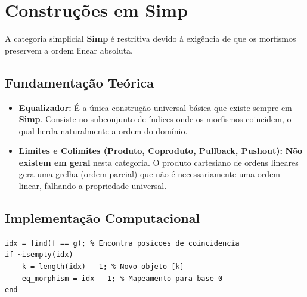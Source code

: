 \section{Construções em Simp}

A categoria simplicial \textbf{Simp} é restritiva devido à exigência de que os morfismos preservem a ordem linear absoluta.

\subsection{Fundamentação Teórica}
\begin{itemize}
    \item \textbf{Equalizador:} É a única construção universal básica que existe sempre em \textbf{Simp}. Consiste no subconjunto de índices onde os morfismos coincidem, o qual herda naturalmente a ordem do domínio.
    \item \textbf{Limites e Colimites (Produto, Coproduto, Pullback, Pushout):} \textbf{Não existem em geral} nesta categoria. O produto cartesiano de ordens lineares gera uma grelha (ordem parcial) que não é necessariamente uma ordem linear, falhando a propriedade universal.
\end{itemize}

\subsection{Implementação Computacional}
\begin{lstlisting}[caption={Cálculo do Equalizador Simplicial}]
% f e g sao morfismos [n] -> [m] (vetores ordenados)
idx = find(f == g); % Encontra posicoes de coincidencia
if ~isempty(idx)
    k = length(idx) - 1; % Novo objeto [k]
    eq_morphism = idx - 1; % Mapeamento para base 0
end
\end{lstlisting}